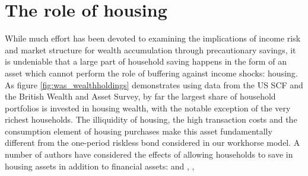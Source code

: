 \section{The role of housing}\label{housing}
While much effort has been devoted to examining the implications of income risk
and market structure for wealth accumulation through precautionary savings, it 
is undeniable that a large part of household saving happens in the form of an
asset which cannot perform the role of buffering against income shocks: housing.
As figure \ref{fig:was_wealthholdings} demonstrates using data from the US SCF and
the British Wealth and Asset Survey, by far the largest share of household
portfolios is invested in housing wealth, with the notable exception of the
very richest households. The illiquidity of housing, the high transaction costs
and the consumption element of housing purchases make this asset fundamentally
different from the one-period riskless bond considered in our workhorse model.
A number of authors have considered the effects of allowing households to save
in housing assets in addition to financial assets: \citet{CampbellHercovitz2009} 
and \citet{CampbellHercovitz2005}, \citet{Yang2009}, \citet{Iacoviello2008}

